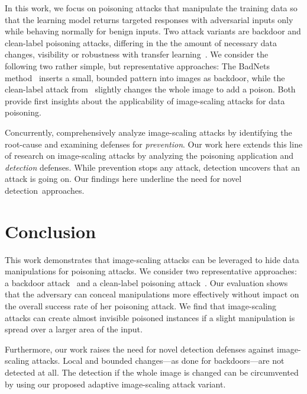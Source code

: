 \documentclass[conference]{IEEEtran}
\begin{document}
In this work, we focus on poisoning attacks that manipulate the 
training data so that the learning model returns targeted 
responses with adversarial inputs only while behaving normally for 
benign inputs. Two attack variants are backdoor and clean-label 
poisoning attacks, differing in the the amount of necessary data 
changes, visibility or robustness with transfer 
learning~\citep[e.g.][]{GuDolGar17, CheLiuLi+17, ShaHuaNaj+18, 
LiuMaAaf+18, YaoLiZhe+19}. 
We consider the following two rather simple, but representative 
approaches:
The BadNets method~\citep{GuDolGar17} inserts a small, bounded pattern 
into images as backdoor, while the clean-label attack 
from~\citet{ShaHuaNaj+18} slightly changes the whole image to add a 
poison. Both provide first insights about the 
applicability of image-scaling attacks for data poisoning.

Concurrently, \citet{QuiKleArp20} comprehensively analyze 
image-scaling attacks by identifying the root-cause and examining
defenses for \emph{prevention}. Our work here extends this line of 
research on image-scaling attacks by analyzing the poisoning 
application and \emph{detection} defenses.  While prevention stops any 
attack, detection uncovers that an attack is going on. Our findings 
here underline the need for novel detection~approaches.




\section{Conclusion}\label{sec:conclusion}
This work demonstrates that image-scaling attacks can be 
leveraged to hide data manipulations for poisoning attacks. We consider 
two representative approaches: a backdoor attack~\citep{GuDolGar17} and 
a clean-label poisoning attack~\citep{ShaHuaNaj+18}. Our evaluation 
shows that the adversary can conceal manipulations more effectively 
without impact on the overall success rate of her poisoning attack. 
We find that image-scaling attacks can create almost invisible poisoned 
instances if a slight manipulation is spread over a larger area of the 
input.


Furthermore, our work raises the need for novel detection defenses 
against image-scaling attacks. Local and bounded changes---as done for 
backdoors---are not detected at all. The detection if the whole image 
is changed can be circumvented by using our proposed adaptive 
image-scaling attack variant. 
\end{document}
